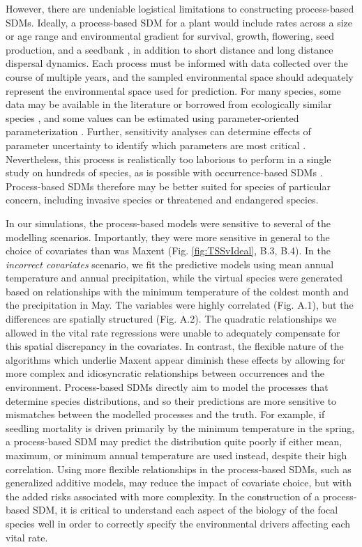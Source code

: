 \documentclass[preprint,review,times,12pt]{elsarticle}
\begin{document}
However, there are undeniable logistical limitations to constructing process-based SDMs. Ideally, a process-based SDM for a plant would include rates across a size or age range and environmental gradient for survival, growth, flowering, seed production, and a seedbank \citep{Ellner2006,Merow2014a}, in addition to short distance and long distance dispersal dynamics. Each process must be informed with data collected over the course of multiple years, and the sampled environmental space should adequately represent the environmental space used for prediction. For many species, some data may be available in the literature or borrowed from ecologically similar species \citep{Merow2011a,Szewczyk2019}, and some values can be estimated using parameter-oriented parameterization \citep{Grimm2005,Merow2011a,Szewczyk2019}. Further, sensitivity analyses can determine effects of parameter uncertainty to identify which parameters are most critical \citep{Prowse2016,Aiello-Lammens2017}. Nevertheless, this process is realistically too laborious to perform in a single study on hundreds of species, as is possible with occurrence-based SDMs \citep{Allen2016}. Process-based SDMs therefore may be better suited for species of particular concern, including invasive species or threatened and endangered species.

In our simulations, the process-based models were sensitive to several of the modelling scenarios. Importantly, they were more sensitive in general to the choice of covariates than was Maxent (Fig. \ref{fig:TSSvIdeal}, B.3, B.4). In the \emph{incorrect covariates} scenario, we fit the predictive models using mean annual temperature and annual precipitation, while the virtual species were generated based on relationships with the minimum temperature of the coldest month and the precipitation in May. The variables were highly correlated (Fig. A.1), but the differences are spatially structured (Fig. A.2). The quadratic relationships we allowed in the vital rate regressions were unable to adequately compensate for this spatial discrepancy in the covariates. In contrast, the flexible nature of the algorithms which underlie Maxent appear diminish these effects by allowing for more complex and idiosyncratic relationships between occurrences and the environment. Process-based SDMs directly aim to model the processes that determine species distributions, and so their predictions are more sensitive to mismatches between the modelled processes and the truth. For example, if seedling mortality is driven primarily by the minimum temperature in the spring, a process-based SDM may predict the distribution quite poorly if either mean, maximum, or minimum annual temperature are used instead, despite their high correlation. Using more flexible relationships in the process-based SDMs, such as generalized additive models, may reduce the impact of covariate choice, but with the added risks associated with more complexity. In the construction of a process-based SDM, it is critical to understand each aspect of the biology of the focal species well in order to correctly specify the environmental drivers affecting each vital rate.
\end{document}
